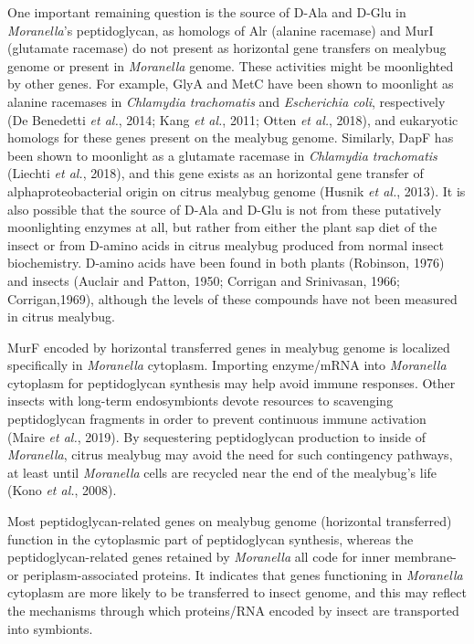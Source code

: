 \documentclass[11pt]{article}
\begin{document}
\begin{sloppypar}
One important remaining question is the source of D-Ala and D-Glu in \textit{Moranella}’s peptidoglycan, as homologs of Alr (alanine racemase) and MurI (glutamate racemase) do not present as horizontal gene transfers on mealybug genome or present in \textit{Moranella} genome. 
These activities might be moonlighted by other genes. 
For example, GlyA and MetC have been shown to moonlight as alanine racemases in \textit{Chlamydia trachomatis} and \textit{Escherichia coli}, respectively (De Benedetti \textit{et al.}, 2014; Kang \textit{et al.}, 2011; Otten \textit{et al.}, 2018), and eukaryotic homologs for these genes present on the mealybug genome. 
Similarly, DapF has been shown to moonlight as a glutamate racemase in \textit{Chlamydia trachomatis} (Liechti \textit{et al.}, 2018), and this gene exists as an horizontal gene transfer of alphaproteobacterial origin on citrus mealybug genome (Husnik \textit{et al.}, 2013). 
It is also possible that the source of D-Ala and D-Glu is not from these putatively moonlighting enzymes at all, but rather from either the plant sap diet of the insect or from D-amino acids in citrus mealybug produced from normal insect
biochemistry. 
D-amino acids have been found in both plants (Robinson, 1976) and insects (Auclair and Patton, 1950; Corrigan and Srinivasan, 1966; Corrigan,1969), although the levels of these compounds have not been measured in citrus mealybug. 

\newline

MurF encoded by horizontal transferred genes in mealybug genome is localized specifically in \textit{Moranella} cytoplasm. 
Importing enzyme/mRNA into \textit{Moranella} cytoplasm for peptidoglycan synthesis may help avoid immune responses. 
Other insects with long-term endosymbionts devote resources to scavenging peptidoglycan fragments in order to prevent continuous immune activation (Maire \textit{et al.}, 2019). 
By sequestering peptidoglycan production to inside of \textit{Moranella}, citrus mealybug may avoid the need for such contingency pathways, at least until \textit{Moranella} cells are recycled near the end of the mealybug’s life (Kono \textit{et al.}, 2008).

\newline

Most peptidoglycan-related genes on mealybug genome (horizontal transferred) function in the cytoplasmic part of peptidoglycan synthesis, whereas the peptidoglycan-related genes retained by \textit{Moranella} all code for inner membrane- or periplasm-associated proteins. 
It indicates that genes functioning in \textit{Moranella} cytoplasm are more likely to be transferred to insect genome, and this may reflect the mechanisms through which proteins/RNA encoded by insect are transported into symbionts. 


\end{sloppypar}
\end{document}
